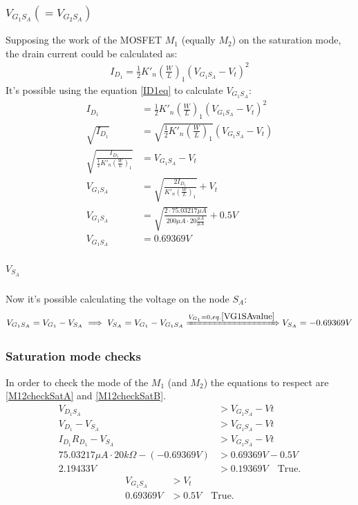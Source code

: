 \subsubsection{$V_{G_1S_A} ( = V_{G_2S_A})$}
Supposing the work of the MOSFET $M_1$ (equally $M_2$) on the saturation mode, the drain current could be calculated as:\\
\begin{align}
I_{D_1} = \frac{1}{2} K'_n \left(\frac{W}{L}\right)_1 (V_{G_1S_A} - V_t)^2 \label{ID1eq}
\end{align}
It's possible using the equation \ref{ID1eq} to calculate $V_{G_1S_A}$:\\
\begin{align}
I_{D_1} &= \frac{1}{2} K'_n \left(\frac{W}{L}\right)_1 (V_{G_1S_A} - V_t)^2\\
\sqrt{I_{D_1}} &= \sqrt{\frac{1}{2} K'_n \left(\frac{W}{L}\right)_1} (V_{G_1S_A} - V_t)\\
\sqrt{\frac{I_{D_1}}{\frac{1}{2} K'_n \left(\frac{W}{L}\right)_1}} &= V_{G_1S_A} - V_t\\
V_{G_1S_A} &= \sqrt{\frac{2I_{D_1}}{K'_n \left(\frac{W}{L}\right)_1}} +V_t\\
V_{G_1S_A} &= \sqrt{\frac{2 \cdot 75.03217 \mu A}{200 \mu A \cdot 20 \frac{\mu A}{\mu A}}} +0.5V\\
V_{G_1S_A} &= 0.69369V \label{VG1SAvalue}
\end{align}

\subparagraph{$V_{S_A}$}
Now it's possible calculating the voltage on the node $S_A$:
\begin{align}
V_{G_1S_A} = V_{G_1} - V_{S_A} \implies V_{S_A} = V_{G_1} - V_{G_1S_A}
\xRightarrow{V_{G_1} = 0, eq. \ref{VG1SAvalue}} V_{S_A} = -0.69369V
\end{align}

\subsubsection{Saturation mode checks}
In order to check the mode of the $M_1$ (and $M_2$) the equations to respect are \ref{M12checkSatA} and \ref{M12checkSatB}.\\
\begin{align}
V_{D_1S_A} &> V_{G_1S_A} - Vt \label{M12checkSatA}\\
V_{D_1} - V_{S_A} &> V_{G_1S_A} - Vt\\
I_{D_1}R_{D_1} - V_{S_A} &> V_{G_1S_A} - Vt\\
75.03217 \mu A \cdot 20k\Omega - (-0.69369V)&> 0.69369V - 0.5V\\
2.19433V &> 0.19369V \quad \text{True.}
\end{align}
\begin{align}
V_{G_1S_A} &> V_t \label{M12checkSatB}\\
0.69369V &> 0.5V \quad \text{True.}
\end{align}


